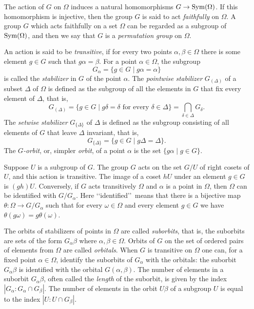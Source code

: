 \documentclass{emsprocart}
\theoremstyle{definition}
\begin{document}
The action of $G$ on $\Omega$ induces a natural homomorphisms
  $G\rightarrow {\mbox{${\rm Sym}$}}(\Omega)$.
If this homomorphism is injective, then the group $G$ is said to act {\em faithfully} on $\Omega$.
A group $G$ which acts faithfully on a set $\Omega$ can be regarded as a
subgroup of ${\mbox{${\rm Sym}$}}(\Omega)$, and then we say that $G$ is
 a {\em permutation group} on $\Omega$.

An action is said to be {\em
transitive}, if for every two points $\alpha, \beta\in \Omega$ there is
some element $g\in G$ such that $g\alpha=\beta$.  For a point $\alpha\in
\Omega$, the subgroup
$$G_\alpha=\{g\in G\mid g\alpha =\alpha\}$$
is called the {\em stabilizer} in $G$
of the point $\alpha$.
The {\em pointwise
stabilizer} $G_{(\Delta)}$
of a subset $\Delta$ of $\Omega$ is defined as the subgroup of all the elements in $G$ that fix
every element of $\Delta$, that is,
$$G_{(\Delta)}=\{g\in G\mid g\delta =\delta \mbox{ for every }\delta\in
\Delta\}=\bigcap_{\delta\in \Delta}G_\delta.$$
The {\em setwise stabilizer} $G_{\{\Delta\}}$ of $\Delta$ is defined as
the subgroup consisting of all elements of $G$ that leave $\Delta$
invariant, that is,
$$G_{\{\Delta\}}=\{g\in G\mid g\Delta=\Delta\}.$$
The {\em $G$-orbit}, or, simpler {\em orbit}, of a
point $\alpha$ is the set $\{g\alpha\mid g\in G\}$.

Suppose $U$ is a subgroup of $G$.  The group $G$ acts on the set
$G/U$ of right cosets of $U$, and this action is transitive.  The image of a
coset $hU$ under an element $g\in G$ is $(gh)U$.  Conversely, if $G$
acts transitively $\Omega$ and $\alpha$ is a point in
$\Omega$, then $\Omega$ can be identified with
$G/G_\alpha$.  Here \lq\lq identified\rq\rq\ means that there is a
bijective map $\theta:\Omega\rightarrow G/G_\alpha$ such that for
every $\omega\in \Omega$ and every element $g\in G$ we have
$\theta(g\omega)=g\theta(\omega)$.

The orbits of stabilizers of points in $\Omega$ are called {\em suborbits},
that is, the suborbits are sets of the form $G_\alpha\beta$ where $\alpha,
\beta\in \Omega$.  Orbits of $G$ on the set of ordered pairs of elements from
$\Omega$ are called {\it orbitals}.  When $G$ is transitive on
$\Omega$ one can, for a fixed point
$\alpha\in\Omega$, identify the suborbits of $G_\alpha$ with
the orbitals: the suborbit $G_\alpha\beta$ is identified with the
orbital $G(\alpha, \beta)$.
The
number of elements in a suborbit $G_\alpha\beta$, often called the
{\em length} of the suborbit, is given by the
index $|G_\alpha: G_\alpha\cap G_\beta|$.
The number of elements in the orbit $U\beta$ of a
subgroup $U$ is equal to
the index $|U:U\cap G_\beta|$.
\end{document}

